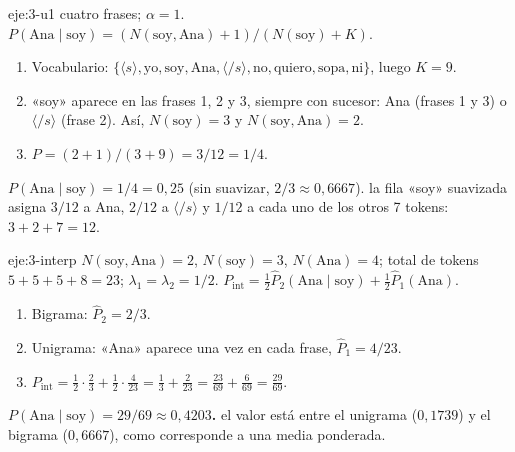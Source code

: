\begin{solucion}{eje:3-u1}
\datos cuatro frases; $\alpha=1$.
\planteamiento $P(\text{Ana}\mid\text{soy})=(N(\text{soy},\text{Ana})+1)/(N(\text{soy})+K)$.
\pasos
\begin{enumerate}[label=\arabic*.]
  \item Vocabulario: $\{\langle s\rangle,\text{yo},\text{soy},\text{Ana},\langle/s\rangle,\text{no},\text{quiero},\text{sopa},\text{ni}\}$, luego $K=9$.
  \item «soy» aparece en las frases 1, 2 y 3, siempre con sucesor: Ana (frases 1 y 3) o $\langle/s\rangle$ (frase 2). Así, $N(\text{soy})=3$ y $N(\text{soy},\text{Ana})=2$.
  \item $P=(2+1)/(3+9)=3/12=1/4$.
\end{enumerate}
\resultado \textbf{$P(\text{Ana}\mid\text{soy})=1/4=0{,}25$} (sin suavizar, $2/3\approx 0{,}6667$).
\comprobacion la fila «soy» suavizada asigna $3/12$ a Ana, $2/12$ a $\langle/s\rangle$ y $1/12$ a cada uno de los otros 7 tokens: $3+2+7=12$.
\end{solucion}

\begin{solucion}{eje:3-interp}
\datos $N(\text{soy},\text{Ana})=2$, $N(\text{soy})=3$, $N(\text{Ana})=4$; total de tokens $5+5+5+8=23$; $\lambda_1=\lambda_2=1/2$.
\planteamiento $P_{\mathrm{int}}=\tfrac12\widehat P_2(\text{Ana}\mid\text{soy})+\tfrac12\widehat P_1(\text{Ana})$.
\pasos
\begin{enumerate}[label=\arabic*.]
  \item Bigrama: $\widehat P_2=2/3$.
  \item Unigrama: «Ana» aparece una vez en cada frase, $\widehat P_1=4/23$.
  \item $P_{\mathrm{int}}=\tfrac12\cdot\tfrac23+\tfrac12\cdot\tfrac{4}{23}=\tfrac13+\tfrac{2}{23}=\tfrac{23}{69}+\tfrac{6}{69}=\tfrac{29}{69}$.
\end{enumerate}
\resultado \textbf{$P(\text{Ana}\mid\text{soy})=29/69\approx 0{,}4203$.}
\comprobacion el valor está entre el unigrama ($0{,}1739$) y el bigrama ($0{,}6667$), como corresponde a una media ponderada.
\end{solucion}

